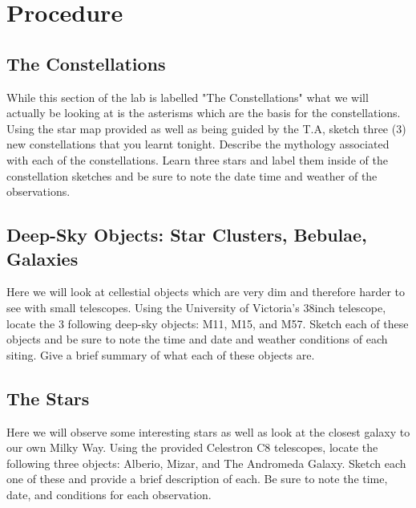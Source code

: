 \documentclass{article}
\begin{document}

\section{Procedure}

\subsection{The Constellations}
While this section of the lab is labelled "The Constellations" what we will actually be looking at is the asterisms which are the
basis for the constellations. Using the star map provided as well as being guided by the T.A, sketch three (3) new constellations
that you learnt tonight. Describe the mythology associated with each of the constellations. Learn three stars and label them 
inside of the constellation sketches and be sure to note the date time and weather of the observations.

\subsection{Deep-Sky Objects: Star Clusters, Bebulae, Galaxies}
Here we will look at cellestial objects which are very dim and therefore harder to see with small telescopes. Using the 
University of Victoria's 38inch telescope, locate the 3 following deep-sky objects: M11, M15, and M57. Sketch each of these
objects and be sure to note the time and date and weather conditions of each siting. Give a brief summary of what each
of these objects are.

\subsection{The Stars}
Here we will observe some interesting stars as well as look at the closest galaxy to our own Milky Way. Using the provided
Celestron C8 telescopes, locate the following three objects: Alberio, Mizar, and The Andromeda Galaxy. Sketch each one of these
and provide a brief description of each. Be sure to note the time, date, and conditions for each observation.


\end{document}
